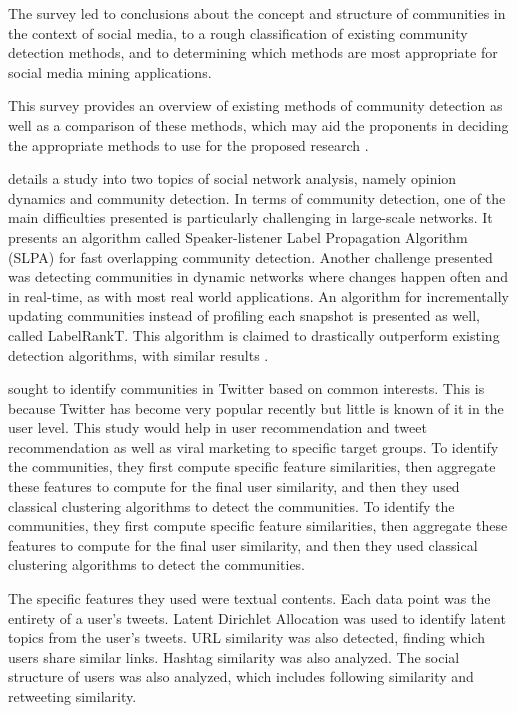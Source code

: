 The survey led to conclusions about the concept and structure of communities in the context of social media, to a rough classification of existing community detection methods, and to determining which methods are most appropriate for social media mining applications. 

This survey provides an overview of existing methods of community detection as well as a comparison of these methods, which may aid the proponents in deciding the appropriate methods to use for the proposed research \cite{Papadopoulos:2012}.

 details a study into two topics of social network analysis, namely opinion dynamics and community detection. In terms of community detection, one of the main difficulties presented is particularly challenging in large-scale networks. It presents an algorithm called Speaker-listener Label Propagation Algorithm (SLPA) for fast overlapping community detection. Another challenge presented was detecting communities in dynamic networks where changes happen often and in real-time, as with most real world applications. An algorithm for incrementally updating communities instead of profiling each snapshot is presented as well, called LabelRankT. This algorithm is claimed to drastically outperform existing detection algorithms, with similar results \cite{Xie:2012}. 

 sought to identify communities in Twitter based on common interests. This is because Twitter has become very popular recently but little is known of it in the user level. This study would help in user recommendation and tweet recommendation as well as viral marketing to specific target groups. To identify the communities, they first compute specific feature similarities, then aggregate these features to compute for the final user similarity, and then they used classical clustering algorithms to detect the communities. To identify the communities, they first compute specific feature similarities, then aggregate these features to compute for the final user similarity, and then they used classical clustering algorithms to detect the communities.

The specific features they used were textual contents. Each data point was the entirety of a user’s tweets. Latent Dirichlet Allocation was used to identify latent topics from the user’s tweets. URL similarity was also detected, finding which users share similar links. Hashtag similarity was also analyzed. The social structure of users was also analyzed, which includes following similarity and retweeting similarity. 

